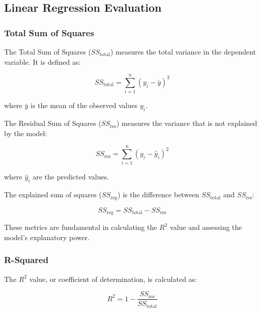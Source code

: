 \documentclass{article}
\theoremstyle{definition}
\theoremstyle{theorem}
\theoremstyle{theorem}
\theoremstyle{theorem}
\theoremstyle{theorem}
\theoremstyle{definition}
\theoremstyle{definition}
\theoremstyle{definition}
\theoremstyle{definition}
\theoremstyle{definition}
\begin{document}
\subsection{Linear Regression Evaluation}
\subsubsection{Total Sum of Squares}

The Total Sum of Squares (\(SS_{\text{total}}\)) measures the total variance in the dependent variable. It is defined as:

\[
SS_{\text{total}} = \sum_{i=1}^{n} (y_i - \bar{y})^2
\]

where \( \bar{y} \) is the mean of the observed values \( y_i \).

The Residual Sum of Squares (\(SS_{\text{res}}\)) measures the variance that is not explained by the model:

\[
SS_{\text{res}} = \sum_{i=1}^{n} (y_i - \hat{y}_i)^2
\]

where \( \hat{y}_i \) are the predicted values.

The explained sum of squares (\(SS_{\text{reg}}\)) is the difference between \(SS_{\text{total}}\) and \(SS_{\text{res}}\):

\[
SS_{\text{reg}} = SS_{\text{total}} - SS_{\text{res}}
\]

These metrics are fundamental in calculating the \( R^2 \) value and assessing the model's explanatory power.

\subsubsection{R-Squared}

The \( R^2 \) value, or coefficient of determination, is calculated as:

\[
R^2 = 1 - \frac{SS_{\text{res}}}{SS_{\text{total}}}
\]
\end{document}
